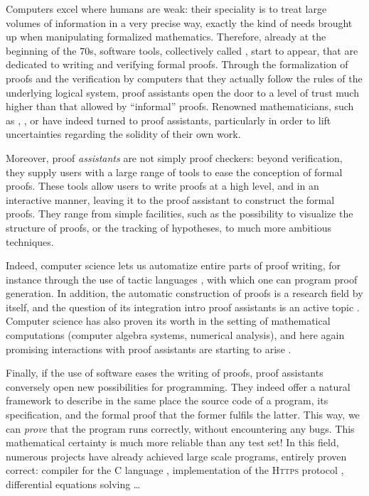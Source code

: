 Computers excel where humans are weak: their speciality is to treat large volumes of
information in a very precise way, exactly the kind of needs brought up when manipulating
formalized mathematics. Therefore, already at the beginning of the 70s,%
%
%
software tools, collectively called , start to
appear, that are dedicated to writing and verifying formal proofs.
Through the formalization of proofs and the verification by computers that they
actually follow the rules of the underlying logical system, proof assistants open the
door to a level of trust much higher than that allowed by “informal” proofs.
Renowned mathematicians, such as ,
, or  have indeed
turned to proof assistants, particularly in order to lift uncertainties regarding the
solidity of their own work.

Moreover, proof \emph{assistants} are not simply proof checkers: beyond verification,
they supply users with a large range of tools to ease the conception of
formal proofs. These tools allow users to write proofs at a
high level, and in an interactive manner,%
leaving it to the proof assistant to construct the formal proofs.
They range from simple facilities, such as the possibility to visualize the structure
of proofs, or the tracking of hypotheses, to much more ambitious techniques.

Indeed, computer science lets us automatize entire parts of
proof writing, for instance through the use of tactic languages ,
with which one can program proof generation.
In addition, the automatic construction of proofs is a research field by itself,
and the question of its integration intro proof assistants is an active topic
. Computer science has also proven its worth in the
setting of mathematical computations (computer algebra systems, numerical analysis),
and here again promising interactions with proof assistants are starting to arise
.

Finally, if the use of software eases the writing of proofs, proof assistants conversely
open new possibilities for programming. They indeed offer a natural framework to describe in
the same place the source code of a program, its specification, and the formal proof that the
former fulfils the latter. This way, we can \emph{prove} that the program runs correctly,
without encountering any bugs.
This mathematical certainty is much more reliable than any test set!
In this field, numerous projects have already achieved large scale programs, entirely proven
correct: compiler for the C language , implementation of the
\textsc{Https} protocol , differential equations solving
…

